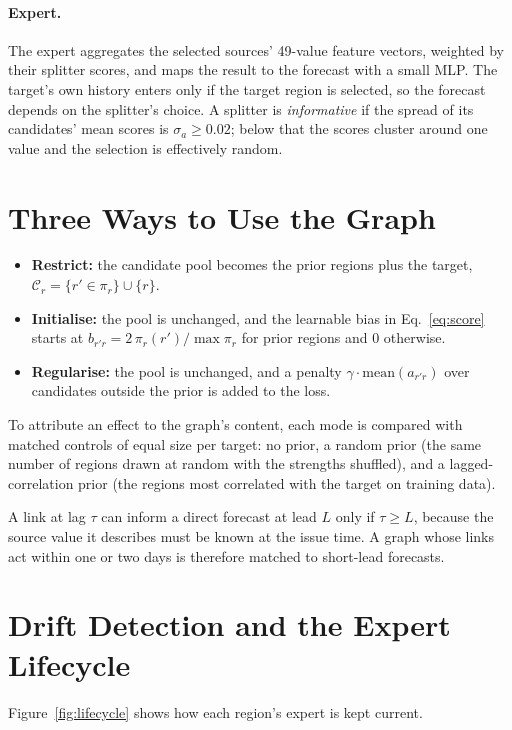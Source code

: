\paragraph{Expert.} The expert aggregates the selected sources' 49-value feature vectors, weighted by their splitter scores, and maps the result to the forecast with a small MLP. The target's own history enters only if the target region is selected, so the forecast depends on the splitter's choice. A splitter is \emph{informative} if the spread of its candidates' mean scores is $\sigma_a\ge0.02$; below that the scores cluster around one value and the selection is effectively random.

\section{Three Ways to Use the Graph}
\label{sec:moe-modes}

\begin{itemize}
  \item \textbf{Restrict:} the candidate pool becomes the prior regions plus the target, $\mathcal{C}_r=\{r'\in\pi_r\}\cup\{r\}$.
  \item \textbf{Initialise:} the pool is unchanged, and the learnable bias in Eq.~\eqref{eq:score} starts at $b_{r'r}=2\,\pi_r(r')/\max\pi_r$ for prior regions and 0 otherwise.
  \item \textbf{Regularise:} the pool is unchanged, and a penalty $\gamma\cdot\mathrm{mean}(a_{r'r})$ over candidates outside the prior is added to the loss.
\end{itemize}
To attribute an effect to the graph's content, each mode is compared with matched controls of equal size per target: no prior, a random prior (the same number of regions drawn at random with the strengths shuffled), and a lagged-correlation prior (the regions most correlated with the target on training data).

A link at lag $\tau$ can inform a direct forecast at lead $L$ only if $\tau\ge L$, because the source value it describes must be known at the issue time. A graph whose links act within one or two days is therefore matched to short-lead forecasts.

\section{Drift Detection and the Expert Lifecycle}
\label{sec:lifecycle}

Figure~\ref{fig:lifecycle} shows how each region's expert is kept current.

